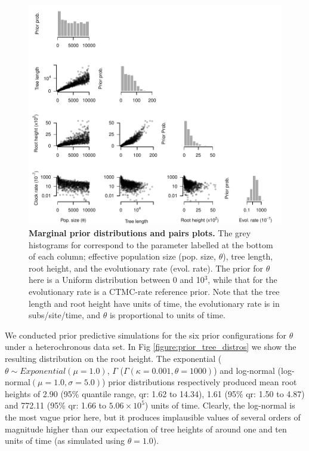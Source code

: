 \documentclass[10pt,letterpaper]{article}
\begin{document}
\begin{figure}[!h]
		\begin{center}
		\includegraphics[width=14.7cm]{sandbox_figures/prior_predictive_plots.pdf}\newline
		\vspace{-0.5cm}
  \newline
		\caption{\textbf{Marginal prior distributions and pairs plots.} The grey histograms for correspond to the parameter labelled at the bottom of each column; effective population size (pop. size, $\theta$), tree length, root height, and the evolutionary rate (evol. rate). The prior for $\theta$ here is a Uniform distribution between 0 and 10$^3$, while that for the evolutionary rate is a CTMC-rate reference prior. Note that the tree length and root height have units of time, the evolutionary rate is in subs/site/time, and $\theta$ is proportional to units of time. }
        \label{figure:correlation_plots}
		\end{center}
\end{figure}

We conducted prior predictive simulations for the six prior configurations for $\theta$ under a heterochronous data set. In Fig \ref{figure:prior_tree_distros} we show the resulting distribution on the root height. The exponential ($\theta \sim Exponential(\mu=1.0)$, $\Gamma$ ($\Gamma(\kappa=0.001, \theta=1000)$) and log-normal (log-normal$(\mu=1.0, \sigma=5.0)$) prior distributions respectively produced mean root heights of 2.90 (95\% quantile range, qr: 1.62 to 14.34), 1.61 (95\% qr: 1.50 to 4.87) and 772.11 (95\% qr: 1.66 to $5.06 \times 10^5$) units of time. Clearly, the log-normal is the most vague prior here, but it produces implausible values of several orders of magnitude higher than our expectation of tree heights of around one and ten units of time (as simulated using $\theta=1.0$).
\end{document}

